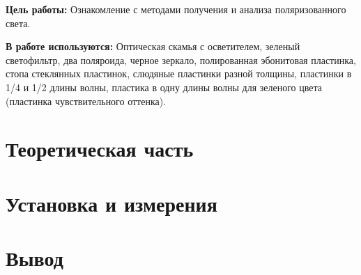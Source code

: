 \documentclass{letask}
\begin{document}


\textbf{Цель работы:} Ознакомление с методами получения и анализа поляризованного света.

\textbf{В работе используются:} Оптическая скамья с осветителем, зеленый светофильтр, два поляроида, черное зеркало, полированная эбонитовая пластинка, стопа стеклянных пластинок, слюдяные пластинки разной толщины, пластинки в 1/4 и 1/2 длины волны, пластика в одну длины волны для зеленого цвета (пластинка чувствительного оттенка).
 
\section{Теоретическая часть}

\section{Установка и измерения}

\section{Вывод}
\end{document}
